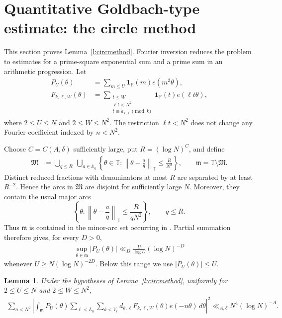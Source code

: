 \documentclass[12pt,reqno]{amsart}
\numberwithin{equation}{section}
\newtheorem{lemma}[equation]{Lemma}
\theoremstyle{definition}
\theoremstyle{remark}
\newcommand{\one}{\mathbf{1}}
\begin{document}
\section{Quantitative Goldbach-type estimate: the circle method}
\label{s:app2trial}

This section proves Lemma~\ref{l:circmethod}.  Fourier inversion reduces
the problem to estimates for a prime-square exponential sum and a prime
sum in an arithmetic progression. 
Let
\begin{align*}
 P_U(\theta)
 &=
 \sum_{m\leq U}\one_{\mathbb P}(m)e(m^2\theta),\\
 F_{k,\ell,W}(\theta)
 &=
 \sum_{\substack{t\leq W\\
 \ell t<N^2\\
 t\equiv a_{k,\ell}\pmod k}}
 \one_{\mathbb P}(t)e(\ell t\theta),
\end{align*}
where \(2\leq U\leq N\) and \(2\leq W\leq N^2\).  The restriction
\(\ell t<N^2\) does not change any Fourier coefficient indexed by
\(n<N^2\).

Choose \(C=C(A,\delta)\) sufficiently large, put
\(R=(\log N)^C\), and define
\begin{align*}
 \mathfrak M
 &=
 \bigcup_{q\leq R}\ \bigcup_{a\in\mathbb A_q}
 \left\{\theta\in\mathbb T:
 \left\|\theta-\frac aq\right\|_{\mathbb T}
 \leq\frac{R}{N^2}\right\},
 \qquad
 \mathfrak m=\mathbb T\setminus\mathfrak M.
\end{align*}
Distinct reduced fractions with denominators at most \(R\) are
separated by at least \(R^{-2}\).  Hence the arcs in \(\mathfrak M\)
are disjoint for sufficiently large \(N\).  Moreover, they contain
the usual major arcs
\[
 \left\{\theta:
 \left\|\theta-\frac aq\right\|_{\mathbb T}
 \leq\frac{R}{qN^2}\right\},
 \qquad q\leq R.
\]
Thus \(\mathfrak m\) is contained in the minor-arc set occurring in
\cite[Theorem~1]{Xiumin2005}.  Partial summation therefore gives, for
every \(D>0\),
\begin{align}\label{e:prime-square-minor}
 \sup_{\theta\in\mathfrak m}|P_U(\theta)|
 \ll_D \frac{U}{\log U}(\log N)^{-D}
\end{align}
whenever \(U\geq N(\log N)^{-2D}\).  Below this range we use
\(|P_U(\theta)|\leq U\).

\begin{lemma}
\label{l:hybridminorarc}
Under the hypotheses of Lemma~\ref{l:circmethod}, uniformly for
\(2\leq U\leq N\) and \(2\leq W\leq N^2\),
\begin{align}\label{e:BVinput9}
 \sum_{n<N^2}\left|
 \int_{\mathfrak m}P_U(\theta)
 \sum_{\ell<L_0}\sum_{k<V_\ell}
 d_{k,\ell}F_{k,\ell,W}(\theta)e(-n\theta)\,d\theta
 \right|^2
 \ll_{A,\delta}N^4(\log N)^{-A}.
\end{align}
\end{lemma}
\end{document}
